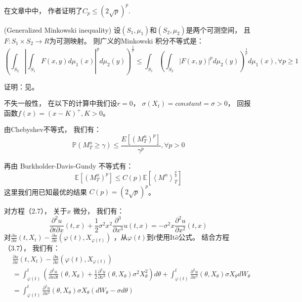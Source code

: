 在文章中\cite{LPEstimates}中， 作者证明了$C_p\leq (2\sqrt{p})^p$.

\begin{lemma}{(Generalized Minkowski inequality)}
设$(S_1,\mu_1)$和$(S_2,\mu_2)$是两个可测空间， 且$F : S_1\times S_2\rightarrow R$为可测映射。 
则广义的Minkowski 积分不等式是：
\begin{equation}
(\int_{S_2}|\int_{S_1}F(x,y)d\mu_1(x)|^pd\mu_2(y))^{\frac{1}{p}}\leq \int_{S_1}(\int_{S_2}|F(x,y)|^pd\mu_2(y))^{\frac{1}{p}}d\mu_1(x), \forall p\geq 1
\end{equation}
\end{lemma}
证明：见\cite{SingularIntegrals}。

不失一般性， 在以下的计算中我们设$r=0$， $\sigma(X_t)=constant=\sigma>0$， 回报函数$f(x)=(x-K)^{+}, K>0$。  

由Chebyshev不等式， 我们有： 
\begin{equation}
\mathbb{P}(M_T^n\geq \gamma)\leq \frac{E[(M_T^n)^p]}{\gamma^p}, \forall p>0
\end{equation}

再由 Burkholder-Davis-Gundy 不等式有： 
\begin{equation}
\mathbb{E}[(M_T^n)^p]\leq C(p)\mathbb{E}[\left \langle M^n \right \rangle_T^{\frac{p}{2}}]
\end{equation}
这里我们用已知最优的结果 $C(p)=(2\sqrt{p})^p$。

对方程（2.7）， 关于$x$ 微分， 我们有：
\begin{equation}
\frac{\partial^2 u}{\partial t \partial x}(t, x) +\frac{1}{2}\sigma^2x^2\frac{\partial^3}{\partial x^3}u(t,x)=
-\sigma^2x\frac{\partial^2u}{\partial x^2}(t, x)
\end{equation}
对$\frac{\partial u}{\partial x}(t, X_t)-\frac{\partial u}{\partial x}(\varphi(t), X_{\varphi(t)})$ ，从$\varphi(t)$到$t$使用It$\hat{o}$公式。
结合方程 （3.7）， 我们有：
\begin{equation}
\begin{split}
&\frac{\partial u}{\partial x}(t, X_t)-\frac{\partial u}{\partial x}(\varphi(t), X_{\varphi(t)})\\
&=\int_{\varphi(t)}^t (\frac{\partial^2 u}{\partial x\partial t}(\theta, 
X_\theta)+\frac{1}{2}\frac{\partial^3 u}{\partial x^3}(\theta, X_\theta)\sigma^2X^2_\theta) d\theta
+ \int_{\varphi(t)}^t \frac{\partial^2 u}{\partial x^2}(\theta, X_\theta)\sigma X_\theta dW_\theta\\
&=  \int_{\varphi(t)}^t \frac{\partial^2 u}{\partial x^2}(\theta, X_\theta)\sigma X_\theta (dW_\theta-\sigma d\theta)\\
\end{split}
\end{equation}

